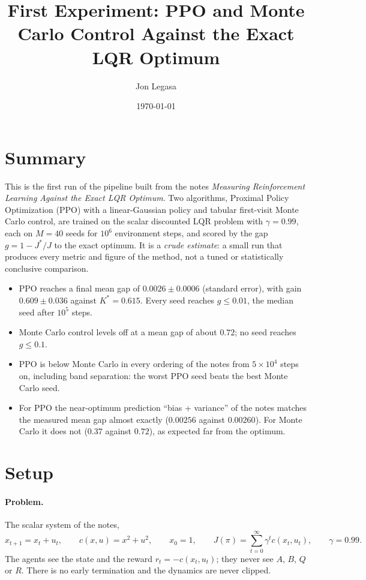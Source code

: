 \documentclass[11pt]{article}
\title{First Experiment: PPO and Monte Carlo Control Against the Exact LQR Optimum}
\author{Jon Legasa}
\date{\today}
\begin{document}
\maketitle

\section*{Summary}

This is the first run of the pipeline built from the notes \emph{Measuring Reinforcement Learning
Against the Exact LQR Optimum}. Two algorithms, Proximal Policy Optimization (PPO) with a
linear-Gaussian policy and tabular first-visit Monte Carlo control, are trained on the scalar
discounted LQR problem with $\gamma = 0.99$, each on $M = 40$ seeds for $10^6$ environment steps,
and scored by the gap $g = 1 - J^*/J$ to the exact optimum. It is a \emph{crude estimate}: a small
run that produces every metric and figure of the method, not a tuned or statistically conclusive
comparison.

\begin{itemize}[leftmargin=*]
  \item PPO reaches a final mean gap of $0.0026 \pm 0.0006$ (standard error), with gain
    $0.609 \pm 0.036$ against $K^* = 0.615$. Every seed reaches $g \le 0.01$, the median seed after
    $10^5$ steps.
  \item Monte Carlo control levels off at a mean gap of about $0.72$; no seed reaches $g \le 0.1$.
  \item PPO is below Monte Carlo in every ordering of the notes from $5\times 10^4$ steps on,
    including band separation: the worst PPO seed beats the best Monte Carlo seed.
  \item For PPO the near-optimum prediction ``bias + variance'' of the notes matches the measured
    mean gap almost exactly ($0.00256$ against $0.00260$). For Monte Carlo it does not
    ($0.37$ against $0.72$), as expected far from the optimum.
\end{itemize}

\section{Setup}
\label{sec:setup}

\paragraph{Problem.} The scalar system of the notes,
\[
  x_{t+1} = x_t + u_t, \qquad c(x, u) = x^2 + u^2, \qquad x_0 = 1, \qquad
  J(\pi) = \sum_{t=0}^{\infty} \gamma^t c(x_t, u_t), \qquad \gamma = 0.99 .
\]
The agents see the state and the reward $r_t = -c(x_t, u_t)$; they never see $A$, $B$, $Q$ or $R$.
There is no early termination and the dynamics are never clipped.
\end{document}

